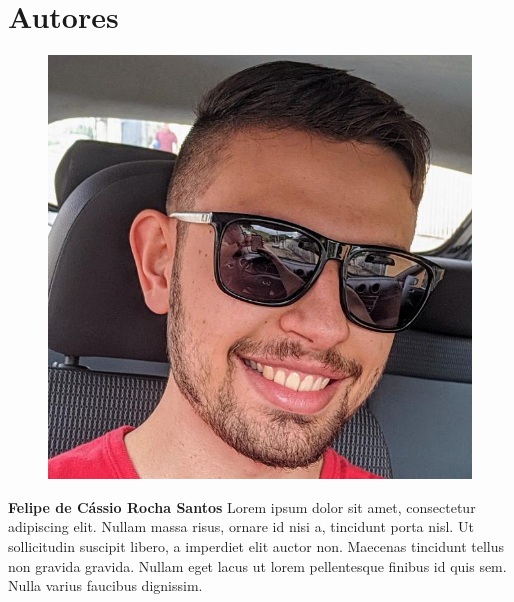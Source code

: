 \section*{Autores}

\begin{figure}
\includegraphics[width=\linewidth]{figuras/autor_felipe.jpg}
\end{figure}

\textbf{Felipe de Cássio Rocha Santos} Lorem ipsum dolor sit amet, consectetur adipiscing elit. Nullam massa risus, ornare id nisi a, tincidunt porta nisl. Ut sollicitudin suscipit libero, a imperdiet elit auctor non. Maecenas tincidunt tellus non gravida gravida. Nullam eget lacus ut lorem pellentesque finibus id quis sem. Nulla varius faucibus dignissim.\newline

